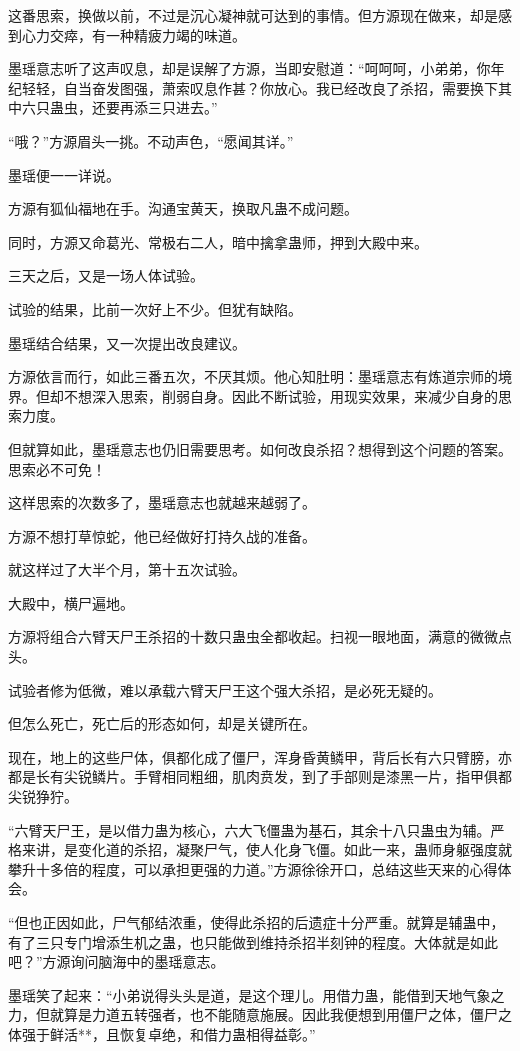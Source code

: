 \begin{this_body}
这番思索，换做以前，不过是沉心凝神就可达到的事情。但方源现在做来，却是感到心力交瘁，有一种精疲力竭的味道。

墨瑶意志听了这声叹息，却是误解了方源，当即安慰道：“呵呵呵，小弟弟，你年纪轻轻，自当奋发图强，萧索叹息作甚？你放心。我已经改良了杀招，需要换下其中六只蛊虫，还要再添三只进去。”

“哦？”方源眉头一挑。不动声色，“愿闻其详。”

墨瑶便一一详说。

方源有狐仙福地在手。沟通宝黄天，换取凡蛊不成问题。

同时，方源又命葛光、常极右二人，暗中擒拿蛊师，押到大殿中来。

三天之后，又是一场人体试验。

试验的结果，比前一次好上不少。但犹有缺陷。

墨瑶结合结果，又一次提出改良建议。

方源依言而行，如此三番五次，不厌其烦。他心知肚明：墨瑶意志有炼道宗师的境界。但却不想深入思索，削弱自身。因此不断试验，用现实效果，来减少自身的思索力度。

但就算如此，墨瑶意志也仍旧需要思考。如何改良杀招？想得到这个问题的答案。思索必不可免！

这样思索的次数多了，墨瑶意志也就越来越弱了。

方源不想打草惊蛇，他已经做好打持久战的准备。

就这样过了大半个月，第十五次试验。

大殿中，横尸遍地。

方源将组合六臂天尸王杀招的十数只蛊虫全都收起。扫视一眼地面，满意的微微点头。

试验者修为低微，难以承载六臂天尸王这个强大杀招，是必死无疑的。

但怎么死亡，死亡后的形态如何，却是关键所在。

现在，地上的这些尸体，俱都化成了僵尸，浑身昏黄鳞甲，背后长有六只臂膀，亦都是长有尖锐鳞片。手臂相同粗细，肌肉贲发，到了手部则是漆黑一片，指甲俱都尖锐狰狞。

“六臂天尸王，是以借力蛊为核心，六大飞僵蛊为基石，其余十八只蛊虫为辅。严格来讲，是变化道的杀招，凝聚尸气，使人化身飞僵。如此一来，蛊师身躯强度就攀升十多倍的程度，可以承担更强的力道。”方源徐徐开口，总结这些天来的心得体会。

“但也正因如此，尸气郁结浓重，使得此杀招的后遗症十分严重。就算是辅蛊中，有了三只专门增添生机之蛊，也只能做到维持杀招半刻钟的程度。大体就是如此吧？”方源询问脑海中的墨瑶意志。

墨瑶笑了起来：“小弟说得头头是道，是这个理儿。用借力蛊，能借到天地气象之力，但就算是力道五转强者，也不能随意施展。因此我便想到用僵尸之体，僵尸之体强于鲜活**，且恢复卓绝，和借力蛊相得益彰。”


\end{this_body}
